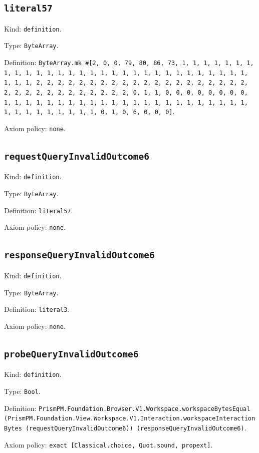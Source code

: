 \documentclass[11pt]{article}
\begin{document}
\subsection*{\texttt{literal57}}
\noindent Kind: \texttt{definition}.\par
\noindent Type: \texttt{ByteArray}.\par
\noindent Definition: \texttt{ByteArray.mk \#[2, 0, 0, 79, 80, 86, 73, 1, 1, 1, 1, 1, 1, 1, 1, 1, 1, 1, 1, 1, 1, 1, 1, 1, 1, 1, 1, 1, 1, 1, 1, 1, 1, 1, 1, 1, 1, 1, 1, 1, 2, 2, 2, 2, 2, 2, 2, 2, 2, 2, 2, 2, 2, 2, 2, 2, 2, 2, 2, 2, 2, 2, 2, 2, 2, 2, 2, 2, 2, 2, 2, 2, 0, 1, 1, 0, 0, 0, 0, 0, 0, 0, 0, 1, 1, 1, 1, 1, 1, 1, 1, 1, 1, 1, 1, 1, 1, 1, 1, 1, 1, 1, 1, 1, 1, 1, 1, 1, 1, 1, 1, 1, 1, 1, 1, 0, 1, 0, 6, 0, 0, 0]}.\par
\noindent Axiom policy: \texttt{none}.\par
\subsection*{\texttt{requestQueryInvalidOutcome6}}
\noindent Kind: \texttt{definition}.\par
\noindent Type: \texttt{ByteArray}.\par
\noindent Definition: \texttt{literal57}.\par
\noindent Axiom policy: \texttt{none}.\par
\subsection*{\texttt{responseQueryInvalidOutcome6}}
\noindent Kind: \texttt{definition}.\par
\noindent Type: \texttt{ByteArray}.\par
\noindent Definition: \texttt{literal3}.\par
\noindent Axiom policy: \texttt{none}.\par
\subsection*{\texttt{probeQueryInvalidOutcome6}}
\noindent Kind: \texttt{definition}.\par
\noindent Type: \texttt{Bool}.\par
\noindent Definition: \texttt{PrismPM.Foundation.Browser.V1.Workspace.workspaceBytesEqual (PrismPM.Foundation.View.Workspace.V1.Interaction.workspaceInteractionBytes (requestQueryInvalidOutcome6)) (responseQueryInvalidOutcome6)}.\par
\noindent Axiom policy: \texttt{exact [Classical.choice, Quot.sound, propext]}.\par
\end{document}
